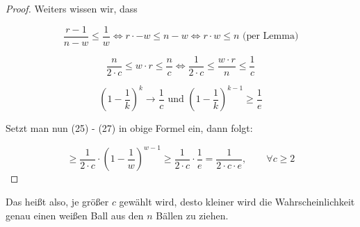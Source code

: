 \documentclass{article}
\begin{document}
\begin{proof}
  \bigskip
  \noindent
  Weiters wissen wir, dass

  \begin{equation}
    \frac{r - 1}{n - w} \leq \frac{1}{w}
      \Longleftrightarrow r \cdot  - w \leq n - w
      \Longleftrightarrow r \cdot w \leq n \text{ (per Lemma)}
  \end{equation}

  \begin{equation}
    \frac{n}{2 \cdot c} \leq w \cdot r \leq \frac{n}{c}
      \Longleftrightarrow \frac{1}{2 \cdot c} \leq \frac{w \cdot r}{n} \leq \frac{1}{c}
  \end{equation}

  \begin{equation}
    \left( 1 - \frac{1}{k} \right)^k \rightarrow \frac{1}{c} \text{ und }
    \left( 1 - \frac{1}{k} \right)^{k - 1} \geq \frac{1}{e}
  \end{equation}

  \bigskip
  \noindent
  Setzt man nun (25) - (27) in obige Formel ein, dann folgt:

  \begin{equation}
    \geq \frac{1}{2 \cdot c} \cdot \left( 1 - \frac{1}{w} \right)^{w - 1}
    \geq \frac{1}{2 \cdot c} \cdot \frac{1}{e} = \frac{1}{2 \cdot c \cdot e},
    \qquad \forall c \geq 2
  \end{equation}
\end{proof}

\noindent
Das hei{\ss}t also, je gr{\"o}{\ss}er $c$ gew{\"a}hlt wird, desto kleiner wird die
Wahrscheinlichkeit genau einen wei{\ss}en Ball aus den $n$ B{\"a}llen zu ziehen.
\end{document}

